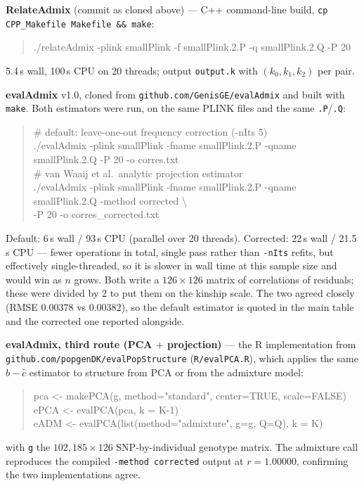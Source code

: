 \documentclass[10pt,a4paper]{article}
\begin{document}
\textbf{RelateAdmix} (commit as cloned above) --- C++ command-line build, \texttt{cp CPP\_Makefile Makefile \&\& make}:
\begin{quote}\ttfamily\small
./relateAdmix -plink smallPlink -f smallPlink.2.P -q smallPlink.2.Q -P 20
\end{quote}
5.4\,s wall, 100\,s CPU on 20 threads; output \texttt{output.k} with $(k_0,k_1,k_2)$ per pair.

\medskip\noindent
\textbf{evalAdmix} v1.0, cloned from \texttt{github.com/GenisGE/evalAdmix} and built with \texttt{make}. Both
estimators were run, on the same PLINK files and the same \texttt{.P}/\texttt{.Q}:
\begin{quote}\ttfamily\small
\# default: leave-one-out frequency correction (-nIts 5)\\
./evalAdmix -plink smallPlink -fname smallPlink.2.P -qname smallPlink.2.Q -P 20 -o corres.txt\\[4pt]
\# van Waaij et al.\ analytic projection estimator\\
./evalAdmix -plink smallPlink -fname smallPlink.2.P -qname smallPlink.2.Q -method corrected \textbackslash\\
\hspace*{2em}-P 20 -o corres\_corrected.txt
\end{quote}
Default: 6\,s wall / 93\,s CPU (parallel over 20 threads). Corrected: 22\,s wall / 21.5\,s CPU --- fewer
operations in total, single pass rather than \texttt{-nIts} refits, but effectively single-threaded, so it is
slower in wall time at this sample size and would win as $n$ grows. Both write a $126\times126$ matrix of
correlations of residuals; these were divided by $2$ to put them on the kinship scale. The two agreed closely
(RMSE $0.00378$ vs $0.00382$), so the default estimator is quoted in the main table and the corrected one
reported alongside.

\medskip\noindent
\textbf{evalAdmix, third route (PCA $+$ projection)} --- the R implementation from
\texttt{github.com/popgenDK/evalPopStructure} (\texttt{R/evalPCA.R}), which applies the same $\hat b-\hat c$
estimator to structure from PCA or from the admixture model:
\begin{quote}\ttfamily\small
pca <- makePCA(g, method="standard", center=TRUE, scale=FALSE)\\
ePCA <- evalPCA(pca, k = K-1)\\[4pt]
eADM <- evalPCA(list(method="admixture", g=g, Q=Q), k = K)
\end{quote}
with \texttt{g} the $102{,}185\times126$ SNP-by-individual genotype matrix. The admixture call reproduces the
compiled \texttt{-method corrected} output at $r=1.00000$, confirming the two implementations agree.
\end{document}
